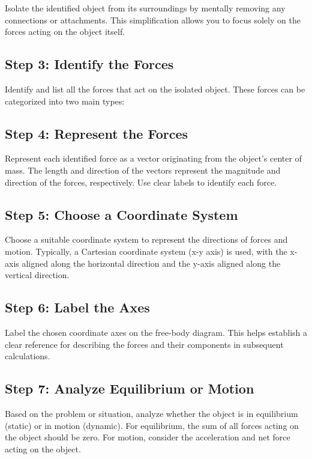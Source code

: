 \documentclass[11pt]{article}
\begin{document}
Isolate the identified object from its surroundings by mentally removing any connections or attachments. This simplification allows you to focus solely on the forces acting on the object itself.

\subsection*{Step 3: Identify the Forces}

Identify and list all the forces that act on the isolated object. These forces can be categorized into two main types:

\subsection*{Step 4: Represent the Forces}

Represent each identified force as a vector originating from the object's center of mass. The length and direction of the vectors represent the magnitude and direction of the forces, respectively. Use clear labels to identify each force.

\subsection*{Step 5: Choose a Coordinate System}

Choose a suitable coordinate system to represent the directions of forces and motion. Typically, a Cartesian coordinate system (x-y axis) is used, with the x-axis aligned along the horizontal direction and the y-axis aligned along the vertical direction.

\subsection*{Step 6: Label the Axes}

Label the chosen coordinate axes on the free-body diagram. This helps establish a clear reference for describing the forces and their components in subsequent calculations.

\subsection*{Step 7: Analyze Equilibrium or Motion}

Based on the problem or situation, analyze whether the object is in equilibrium (static) or in motion (dynamic). For equilibrium, the sum of all forces acting on the object should be zero. For motion, consider the acceleration and net force acting on the object.
\end{document}
